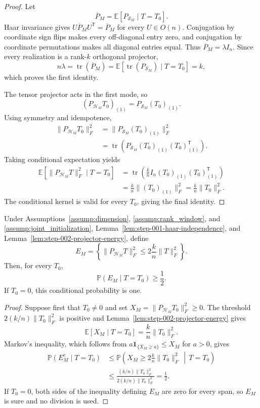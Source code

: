 \begin{proof}
Let
\[
 \overline P_M=\mathbb E[P_{\mathcal S_M}\mid T=T_0].
\]
Haar invariance gives
$U\overline P_MU^{\mathsf T}=\overline P_M$ for every $U\in O(n)$.
Conjugation by coordinate sign flips makes every off-diagonal entry zero, and
conjugation by coordinate permutations makes all diagonal entries equal.
Thus $\overline P_M=\lambda I_n$.  Since every realization is a rank-$k$
orthogonal projector,
\[
 n\lambda=\operatorname{tr}(\overline P_M)
 =\mathbb E[\operatorname{tr}(P_{\mathcal S_M})\mid T=T_0]=k,
\]
which proves the first identity.

The tensor projector acts in the first mode, so
\[
 (P_{\mathcal H_M}T_0)_{(1)}=P_{\mathcal S_M}(T_0)_{(1)}.
\]
Using symmetry and idempotence,
\[
 \begin{aligned}
 \|P_{\mathcal H_M}T_0\|_F^2
 &=\|P_{\mathcal S_M}(T_0)_{(1)}\|_F^2\\
 &=\operatorname{tr}\!\left(
 P_{\mathcal S_M}(T_0)_{(1)}(T_0)_{(1)}^{\mathsf T}\right).
 \end{aligned}
\]
Taking conditional expectation yields
\[
 \begin{aligned}
 \mathbb E[\|P_{\mathcal H_M}T\|_F^2\mid T=T_0]
 &=\operatorname{tr}\!\left(
 \frac{k}{n}I_n(T_0)_{(1)}(T_0)_{(1)}^{\mathsf T}\right)\\
 &=\frac{k}{n}\|(T_0)_{(1)}\|_F^2
 =\frac{k}{n}\|T_0\|_F^2.
 \end{aligned}
\]
The conditional kernel is valid for every $T_0$, giving the final identity.
\end{proof}

\begin{lemma}\label{lem:step-002-markov-event}
Under Assumptions~\ref{assump:dimension}, \ref{assump:rank_window}, and
\ref{assump:joint_initialization}, Lemma~\ref{lem:step-001-haar-independence},
and Lemma~\ref{lem:step-002-projector-energy}, define
\[
 E_M=\left\{
 \|P_{\mathcal H_M}T\|_F^2
 \le2\frac{k}{n}\|T\|_F^2
 \right\}.
\]
Then, for every $T_0$,
\[
 \mathbb P(E_M\mid T=T_0)\ge\frac12.
\]
If $T_0=0$, this conditional probability is one.
\end{lemma}

\begin{proof}
Suppose first that $T_0\ne0$ and set
$X_M=\|P_{\mathcal H_M}T_0\|_F^2\ge0$.  The threshold
$2(k/n)\|T_0\|_F^2$ is positive and
Lemma~\ref{lem:step-002-projector-energy} gives
\[
 \mathbb E[X_M\mid T=T_0]=\frac{k}{n}\|T_0\|_F^2.
\]
Markov's inequality, which follows from
$a\mathbf 1_{\{X_M\ge a\}}\le X_M$ for $a>0$, gives
\[
 \begin{aligned}
 \mathbb P(E_M^c\mid T=T_0)
 &\le\mathbb P\!\left(
 X_M\ge2\frac{k}{n}\|T_0\|_F^2\,\middle|\,T=T_0\right)\\
 &\le\frac{(k/n)\|T_0\|_F^2}
 {2(k/n)\|T_0\|_F^2}=\frac12.
 \end{aligned}
\]
If $T_0=0$, both sides of the inequality defining $E_M$ are zero for every
span, so $E_M$ is sure and no division is used.
\end{proof}

